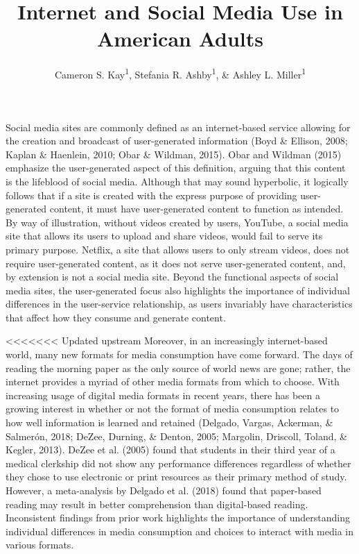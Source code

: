 \documentclass[man, fleqn, noextraspace]{apa6}
\title{Internet and Social Media Use in American Adults}
\author{Cameron S. Kay\textsuperscript{1}, Stefania R. Ashby\textsuperscript{1},
\& Ashley L. Miller\textsuperscript{1}}
\date{}
\affiliation{
\vspace{0.5cm}
\textsuperscript{1} University of Oregon}
\theoremstyle{definition}
\theoremstyle{definition}
\theoremstyle{definition}
\theoremstyle{remark}
\begin{document}
\maketitle

Social media sites are commonly defined as an internet-based service
allowing for the creation and broadcast of user-generated information
(Boyd \& Ellison, 2008; Kaplan \& Haenlein, 2010; Obar \& Wildman,
2015). Obar and Wildman (2015) emphasize the user-generated aspect of
this definition, arguing that this content is the lifeblood of social
media. Although that may sound hyperbolic, it logically follows that if
a site is created with the express purpose of providing user-generated
content, it must have user-generated content to function as intended. By
way of illustration, without videos created by users, YouTube, a social
media site that allows its users to upload and share videos, would fail
to serve its primary purpose. Netflix, a site that allows users to only
stream videos, does not require user-generated content, as it does not
serve user-generated content, and, by extension is not a social media
site. Beyond the functional aspects of social media sites, the
user-generated focus also highlights the importance of individual
differences in the user-service relationship, as users invariably have
characteristics that affect how they consume and generate content.

<<<<<<< Updated upstream
Moreover, in an increasingly internet-based world, many new formats for
media consumption have come forward. The days of reading the morning
paper as the only source of world news are gone; rather, the internet
provides a myriad of other media formats from which to choose. With
increasing usage of digital media formats in recent years, there has
been a growing interest in whether or not the format of media
consumption relates to how well information is learned and retained
(Delgado, Vargas, Ackerman, \& Salmerón, 2018; DeZee, Durning, \&
Denton, 2005; Margolin, Driscoll, Toland, \& Kegler, 2013). DeZee et al.
(2005) found that students in their third year of a medical clerkship
did not show any performance differences regardless of whether they
chose to use electronic or print resources as their primary method of
study. However, a meta-analysis by Delgado et al. (2018) found that
paper-based reading may result in better comprehension than
digital-based reading. Inconsistent findings from prior work highlights
the importance of understanding individual differences in media
consumption and choices to interact with media in various formats.
\end{document}
